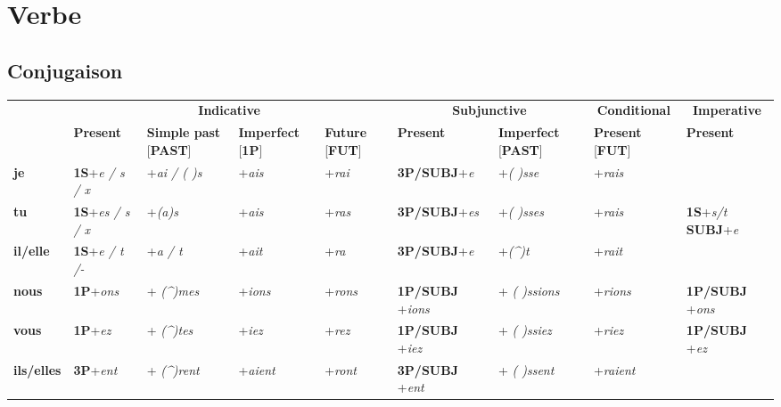 \documentclass[UTF8]{report}
\begin{document}
\chapter{Verbe}
\section{Conjugaison}
\begin{table}[H]
\centering
\small
\setlength{\tabcolsep}{3pt}
\renewcommand{\arraystretch}{1.2}

\begin{tabularx}{\textwidth}{|l|X|X|X|X|X|X|X|X|}
\hline
\rowcolor{cyan!20}
\multicolumn{1}{|c|}{} & \multicolumn{4}{c|}{\textbf{Indicative}} & \multicolumn{2}{c|}{\textbf{Subjunctive}} & \multicolumn{1}{c|}{\textbf{Conditional}} & \multicolumn{1}{c|}{\textbf{Imperative}} \\
\cline{2-9}
\rowcolor{cyan!20}
\multicolumn{1}{|c|}{} & \textbf{Present} & \textbf{Simple past} [\textbf{PAST}] & \textbf{Imperfect} [\textbf{1P}] & \textbf{Future} [\textbf{FUT}] & \textbf{Present} & \textbf{Imperfect} [\textbf{PAST}] & \textbf{Present} [\textbf{FUT}] & \textbf{Present} \\
\hline
\textbf{je} & \textbf{1S}+\textit{e / s / x} & +\textit{ai / ( )s} & +\textit{ais} & +\textit{rai} & \textbf{3P/SUBJ}+\textit{e} &  +\textit{( )sse} & +\textit{rais} & \\
\hline
\textbf{tu} & \textbf{1S}+\textit{es / s / x} & +\textit{(a)s} & +\textit{ais} & +\textit{ras} & \textbf{3P/SUBJ}+\textit{es} & +\textit{( )sses} & +\textit{rais} & \textbf{1S}+\textit{s/t} \textbf{SUBJ}+\textit{e}\\
\hline
\textbf{il/elle} & \textbf{1S}+\textit{e / t /-} & +\textit{a / t} & +\textit{ait} & +\textit{ra} & \textbf{3P/SUBJ}+\textit{e} & +\textit{(\^{})t} & +\textit{rait} & \\
\hline
\textbf{nous} & \textbf{1P}+\textit{ons} & + \textit{(\^{})mes} & +\textit{ions} & +\textit{rons} & \textbf{1P/SUBJ} +\textit{ions}& + \textit{( )ssions} & +\textit{rions} & \textbf{1P/SUBJ} +\textit{ons} \\
\hline
\textbf{vous} & \textbf{1P}+\textit{ez} & + \textit{(\^{})tes} & +\textit{iez} & +\textit{rez} & \textbf{1P/SUBJ} +\textit{iez} & + \textit{( )ssiez} & +\textit{riez} & \textbf{1P/SUBJ} +\textit{ez} \\
\hline
\textbf{ils/elles} & \textbf{3P}+\textit{ent} & + \textit{(\^{})rent} & +\textit{aient} & +\textit{ront} & \textbf{3P/SUBJ} +\textit{ent} & + \textit{( )ssent} & +\textit{raient} & \\
\hline
\end{tabularx}
\end{table}
\end{document}
